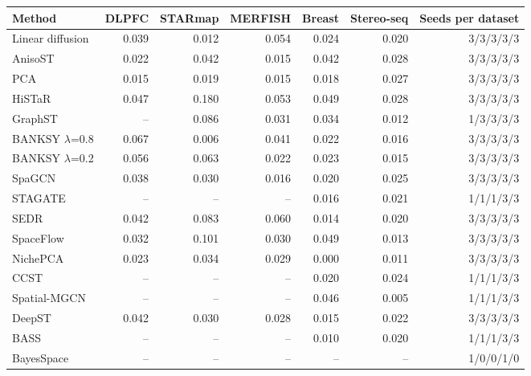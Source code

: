 \footnotesize
\begin{tabular}{lrrrrrr}
\toprule
Method & DLPFC & STARmap & MERFISH & Breast & Stereo-seq & Seeds per dataset \\
\midrule
Linear diffusion & 0.039 & 0.012 & 0.054 & 0.024 & 0.020 & 3/3/3/3/3 \\
AnisoST & 0.022 & 0.042 & 0.015 & 0.042 & 0.028 & 3/3/3/3/3 \\
PCA & 0.015 & 0.019 & 0.015 & 0.018 & 0.027 & 3/3/3/3/3 \\
HiSTaR & 0.047 & 0.180 & 0.053 & 0.049 & 0.028 & 3/3/3/3/3 \\
GraphST & -- & 0.086 & 0.031 & 0.034 & 0.012 & 1/3/3/3/3 \\
BANKSY $\lambda$=0.8 & 0.067 & 0.006 & 0.041 & 0.022 & 0.016 & 3/3/3/3/3 \\
BANKSY $\lambda$=0.2 & 0.056 & 0.063 & 0.022 & 0.023 & 0.015 & 3/3/3/3/3 \\
SpaGCN & 0.038 & 0.030 & 0.016 & 0.020 & 0.025 & 3/3/3/3/3 \\
STAGATE & -- & -- & -- & 0.016 & 0.021 & 1/1/1/3/3 \\
SEDR & 0.042 & 0.083 & 0.060 & 0.014 & 0.020 & 3/3/3/3/3 \\
SpaceFlow & 0.032 & 0.101 & 0.030 & 0.049 & 0.013 & 3/3/3/3/3 \\
NichePCA & 0.023 & 0.034 & 0.029 & 0.000 & 0.011 & 3/3/3/3/3 \\
CCST & -- & -- & -- & 0.020 & 0.024 & 1/1/1/3/3 \\
Spatial-MGCN & -- & -- & -- & 0.046 & 0.005 & 1/1/1/3/3 \\
DeepST & 0.042 & 0.030 & 0.028 & 0.015 & 0.022 & 3/3/3/3/3 \\
BASS & -- & -- & -- & 0.010 & 0.020 & 1/1/1/3/3 \\
BayesSpace & -- & -- & -- & -- & -- & 1/0/0/1/0 \\
\bottomrule
\end{tabular}
